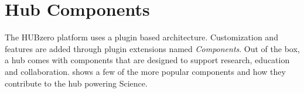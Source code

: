 \section{Hub Components}
\label{sec:hub_components}

The HUBzero platform uses a plugin based architecture. Customization and
features are added through plugin extensions named \textit{Components}. Out of
the box, a hub comes with components that are designed to support research,
education and collaboration.  shows a few
of the more popular components and how they contribute to the hub powering
Science.

%
%
%
%
%
%
%
%
%
%

